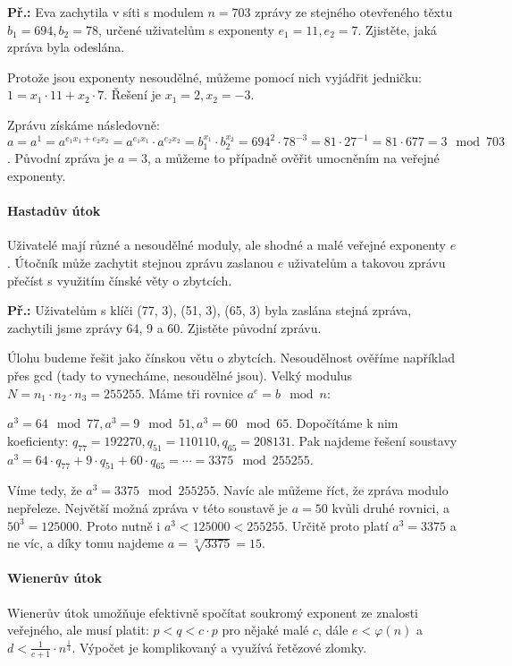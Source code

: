 \documentclass[10pt,a4paper]{article}
\begin{document}
\begin{exercise}
    \textbf{Př.:} Eva zachytila v síti s modulem $n = 703$ zprávy ze stejného
    otevřeného těxtu $b_1 = 694, b_2 = 78$, určené uživatelům s exponenty $e_1 =
    11, e_2 = 7$. Zjistěte, jaká zpráva byla odeslána.

    Protože jsou exponenty nesoudělné, můžeme pomocí nich vyjádřit jedničku: $1
    = x_1\cdot 11 + x_2 \cdot 7$. Řešení je $x_1 = 2, x_2 = -3$.

    Zprávu získáme následovně: $a = a^1 = a^{e_1x_1 + e_2x_2} = a^{e_1x_1}\cdot
    a^{e_2x_2} = b_1^{x_1} \cdot b_2^{x_2} = 694^2 \cdot 78^{-3} = 81 \cdot
    27^{-1} = 81 \cdot 677 = 3 \mod 703$. Původní zpráva je $a = 3$, a můžeme to
    případně ověřit umocněním na veřejné exponenty.
\end{exercise}

\paragraph{Hastadův útok}
Uživatelé mají různé a nesoudělné moduly, ale shodné a malé veřejné exponenty
$e$. Útočník může zachytit stejnou zprávu zaslanou $e$ uživatelům a takovou
zprávu přečíst s využitím čínské věty o zbytcích.

\begin{exercise}
    \textbf{Př.:} Uživatelům s klíči (77, 3), (51, 3), (65, 3) byla zaslána
    stejná zpráva, zachytili jsme zprávy 64, 9 a 60. Zjistěte původní zprávu.

    Úlohu budeme řešit jako čínskou větu o zbytcích. Nesoudělnost ověříme
    například přes gcd (tady to vynecháme, nesoudělné jsou). Velký modulus $N =
    n_1 \cdot n_2 \cdot n_3 = 255255$. Máme tři rovnice $a^e = b \mod n$: 

    $a^3 = 64 \mod 77, a^3 = 9 \mod 51, a^3 = 60 \mod 65$. Dopočítáme k nim
    koeficienty: $q_{77} = 192270, q_{51} = 110110, q_{65} = 208131$. Pak
    najdeme řešení soustavy $a^3 = 64\cdot q_{77} + 9\cdot q_{51} + 60 \cdot
    q_{65} = \cdots = 3375 \mod 255255$.

    Víme tedy, že $a^3 = 3375 \mod 255255$. Navíc ale můžeme říct, že zpráva
    modulo nepřeleze. Největší možná zpráva v této soustavě je $a=50$ kvůli
    druhé rovnici, a $50^3 = 125000$. Proto nutně i $a^3 < 125000 < 255255$.
    Určitě proto platí $a^3 = 3375$ a ne víc, a díky tomu najdeme $a =
    \sqrt[3]{3375} = 15$.
\end{exercise}

\paragraph{Wienerův útok}
Wienerův útok umožňuje efektivně spočítat soukromý exponent ze znalosti
veřejného, ale musí platit: $p < q < c \cdot p$ pro nějaké malé $c$, dále $e <
\varphi(n)$ a $d < \frac{1}{c+1}\cdot n^{\frac{1}{4}}$. Výpočet je komplikovaný
a využívá řetězové zlomky.
\end{document}
